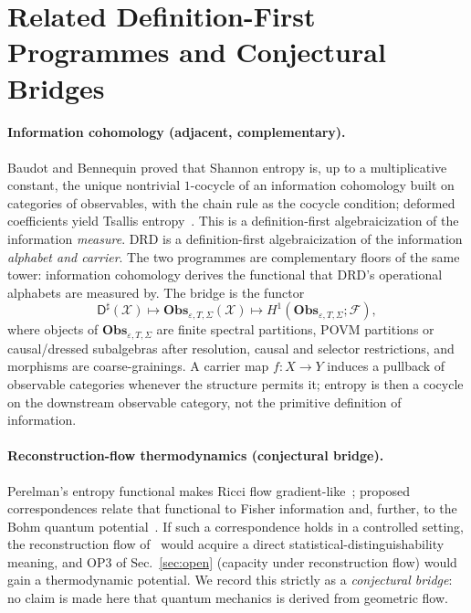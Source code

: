 \documentclass[11pt,a4paper]{article}
\theoremstyle{definition}
\theoremstyle{remark}
\newcommand{\Dsharp}{\mathsf{D}^{\sharp}}
\begin{document}
\section{Related Definition-First Programmes and Conjectural Bridges}
\label{sec:related}

\paragraph{Information cohomology (adjacent, complementary).}
Baudot and Bennequin proved that Shannon entropy is, up to a multiplicative constant, the
unique nontrivial $1$-cocycle of an information cohomology built on categories of observables,
with the chain rule as the cocycle condition; deformed coefficients yield Tsallis
entropy~\cite{BaudotBennequin2015}.  This is a definition-first algebraicization of the
information \emph{measure}.  DRD is a definition-first algebraicization of the information
\emph{alphabet and carrier}.  The two programmes are complementary floors of the same tower:
information cohomology derives the functional that DRD's operational alphabets are measured by.
The bridge is the functor
\[
\Dsharp(\mathcal X)\longmapsto \mathbf{Obs}_{\varepsilon,T,\Sigma}(\mathcal X)
\longmapsto H^1(\mathbf{Obs}_{\varepsilon,T,\Sigma};\mathcal F),
\]
where objects of $\mathbf{Obs}_{\varepsilon,T,\Sigma}$ are finite spectral partitions, POVM
partitions or causal/dressed subalgebras after resolution, causal and selector restrictions, and
morphisms are coarse-grainings.  A carrier map $f:X\to Y$ induces a
pullback of observable categories whenever the structure permits it; entropy is then a
cocycle on the downstream observable category, not the primitive definition of information.

\paragraph{Reconstruction-flow thermodynamics (conjectural bridge).}
Perelman's entropy functional makes Ricci flow gradient-like~\cite{Perelman2002}; proposed
correspondences relate that functional to Fisher information and, further, to the Bohm quantum
potential~\cite{Carroll2006}.  If such a correspondence holds in a controlled setting, the
reconstruction flow of~\cite{BP2026ricci} would acquire a direct statistical-distinguishability
meaning, and OP3 of Sec.~\ref{sec:open} (capacity under reconstruction flow) would gain a
thermodynamic potential.  We record this strictly as a \emph{conjectural bridge}: no claim is
made here that quantum mechanics is derived from geometric flow.
\end{document}
